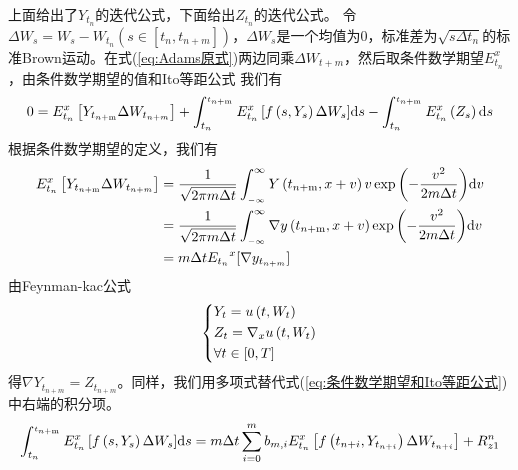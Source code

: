 			上面给出了$Y_{t_n}$的迭代公式，下面给出$Z_{t_n}$的迭代公式。
			令$\Delta W_s=W_s-W_{t_n}(s \in [t_n,t_{n+m}])$，$\Delta W_s$是一个均值为0，标准差为$\sqrt{s\Delta t_n}$的标准Brown运动。在式(\ref{eq:Adams原式})两边同乘$\Delta W_{t+m}$，然后取条件数学期望$E_{t_n}^x$，由条件数学期望的值和Ito等距公式
			我们有
						\begin{align}\label{eq:条件数学期望和Ito等距公式}
						0 = E_{{t_n}}^x\left[ {{Y_{{t_{n{\rm{ + m}}}}}}\Delta {W_{{t_{n + m}}}}} \right] + \int_{{t_n}}^{_{{t_{n{\rm{ + m}}}}}} {E_{{t_n}}^x\left[ {f\left( {s,{Y_s}} \right)\Delta {W_s}} \right]} \mathrm{d}s - \int_{{t_n}}^{_{{t_{n{\rm{ + m}}}}}} {E_{{t_n}}^x\left( {{Z_s}} \right)\mathrm{d}s}
						\end{align}
			根据条件数学期望的定义，我们有
							\begin{equation*}
							\begin{split}
						E_{{t_n}}^x\left[ {{Y_{{t_{n{\rm{ + m}}}}}}\Delta {W_{{t_{n + m}}}}} \right] &= \frac{1}{{\sqrt {2\pi m\Delta t} }}\int_{_{ - \infty }}^\infty  {Y\left( {{{{t_{n{\rm{ + m}}}}}},x + v} \right)v \exp \left( { - \frac{{{v^2}}}{{2m\Delta t}}} \right)} \mathrm{d}v \\
						&=\frac{1}{{\sqrt {2\pi m\Delta t} }}\int_{_{ - \infty }}^\infty  {\nabla y\left( {{{{t_{n{\rm{ + m}}}}}},x + v} \right)\exp \left( { - \frac{{{v^2}}}{{2m\Delta t}}} \right)} \mathrm{d}v\\
						&=m\Delta t {{E_{t_n}}^x}[ \nabla y_{t_{n+m}}]
							\end{split}
							\end{equation*}
			由Feynman-kac公式
					\begin{equation*}
					\centering
					\left\{\begin{lgathered}
					{{Y_t} = u\left( {t,{W_t}} \right)}\\
					{Z_t} = {\nabla _x}u\left( {t,{W_t}} \right)\\
					\forall t \in \left[ {0,T} \right]
					\end{lgathered} \right.
					\end{equation*}
			得$ \nabla {Y_{{t_{n + m}}}} = {Z_{{t_{n + m}}}}$。同样，我们用多项式替代式(\ref{eq:条件数学期望和Ito等距公式})中右端的积分项。
					\begin{align}\label{eq:4}
					\int_{{t_n}}^{_{{t_{n{\rm{ + m}}}}}} {E_{{t_n}}^x\left[ {f\left( {s,{Y_s}} \right)\Delta {W_s}} \right]} \mathrm{d}s = m\Delta t  \sum\limits_{i = 0}^m {{b_{m,i}}} E_{{t_n}}^x\left[ {f\left( {{t_{n + i}},{Y_{{t_{n + i}}}}} \right)\Delta {W_{{t_{n + i}}}}} \right] + R_{z1}^n
					\end{align}
